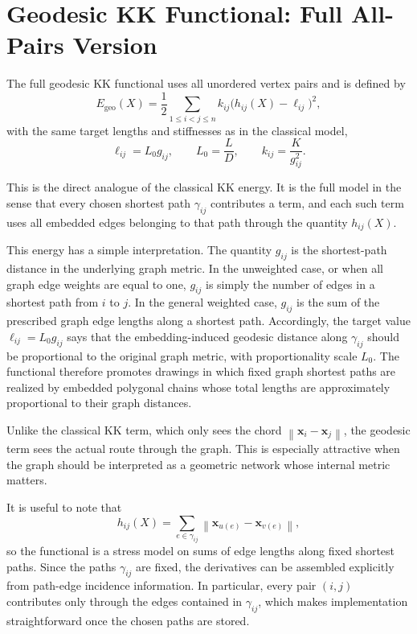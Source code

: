 \documentclass[11pt]{article}
\newcommand{\norm}[1]{\left\lVert #1 \right\rVert}
\newcommand{\vect}[1]{\mathbf{#1}}
\begin{document}
\section*{Geodesic KK Functional: Full All-Pairs Version}

The full geodesic KK functional uses all unordered vertex pairs and is defined by
\[
E_{\mathrm{geo}}(X)
=
\frac{1}{2}\sum_{1 \le i < j \le n}
k_{ij}\bigl(h_{ij}(X)-\ell_{ij}\bigr)^2,
\]
with the same target lengths and stiffnesses as in the classical model,
\[
\ell_{ij} = L_0 g_{ij},
\qquad
L_0 = \frac{L}{D},
\qquad
k_{ij} = \frac{K}{g_{ij}^2}.
\]

This is the direct analogue of the classical KK energy. It is the full model in the sense that
every chosen shortest path $\gamma_{ij}$ contributes a term, and each such term uses all
embedded edges belonging to that path through the quantity $h_{ij}(X)$.

This energy has a simple interpretation. The quantity $g_{ij}$ is the shortest-path distance in
the underlying graph metric. In the unweighted case, or when all graph edge weights are equal
to one, $g_{ij}$ is simply the number of edges in a shortest path from $i$ to $j$. In the
general weighted case, $g_{ij}$ is the sum of the prescribed graph edge lengths along a
shortest path. Accordingly, the target value $\ell_{ij}=L_0 g_{ij}$ says that the
embedding-induced geodesic distance along $\gamma_{ij}$ should be proportional to the
original graph metric, with proportionality scale $L_0$. The functional therefore promotes
drawings in which fixed graph shortest paths are realized by embedded polygonal chains whose
total lengths are approximately proportional to their graph distances.

Unlike the classical KK term, which only sees the chord $\norm{\vect{x}_i-\vect{x}_j}$, the
geodesic term sees the actual route through the graph. This is especially attractive when
the graph should be interpreted as a geometric network whose internal metric matters.

It is useful to note that
\[
h_{ij}(X)
=
\sum_{e\in\gamma_{ij}} \norm{\vect{x}_{u(e)}-\vect{x}_{v(e)}},
\]
so the functional is a stress model on sums of edge lengths along fixed shortest paths. Since
the paths $\gamma_{ij}$ are fixed, the derivatives can be assembled explicitly from path-edge
incidence information. In particular, every pair $(i,j)$ contributes only through the edges
contained in $\gamma_{ij}$, which makes implementation straightforward once the chosen
paths are stored.
\end{document}
